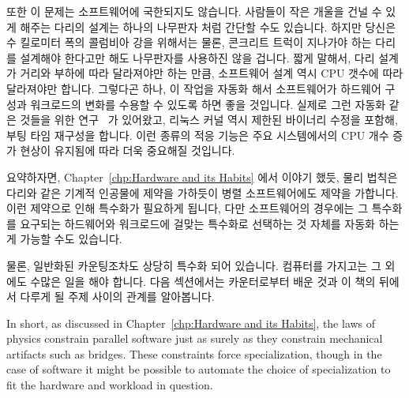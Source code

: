 \begin{lineref}
또한 이 문제는 소프트웨어에 국한되지도 않습니다.
사람들이 작은 개울을 건널 수 있게 해주는 다리의 설계는 하나의 나무판자 처럼
간단할 수도 있습니다.
하지만 당신은 수 킬로미터 폭의 콜럼비아 강을 위해서는 물론, 콘크리트 트럭이
지나가야 하는 다리를 설계해야 한다고만 해도 나무판자를 사용하진 않을 겁니다.
짧게 말해서, 다리 설계가 거리와 부하에 따라 달라져야만 하는 만큼, 소프트웨어
설계 역시 CPU 갯수에 따라 달라져야만 합니다.
그렇다곤 하나, 이 작업을 자동화 해서 소프트웨어가 하드웨어 구성과 워크로드의
변화를 수용할 수 있도록 하면 좋을 것입니다.
실제로 그런 자동화 같은 것들을 위한 연구~\cite{Appavoo03a,Soules03a} 가
있어왔고, 리눅스 커널 역시 제한된 바이너리 수정을 포함해, 부팅 타임 재구성을
합니다.
이런 종류의 적응 기능은 주요 시스템에서의 CPU 개수 증가 현상이 유지됨에 따라
더욱 중요해질 것입니다.

요약하자면, Chapter~\ref{chp:Hardware and its Habits} 에서 이야기 했듯, 물리
법칙은 다리와 같은 기계적 인공물에 제약을 가하듯이 병렬 소프트웨어에도 제약을
가합니다.
이런 제약으로 인해 특수화가 필요하게 됩니다, 다만 소프트웨어의 경우에는 그
특수화를 요구되는 하드웨어와 워크로드에 걸맞는 특수화로 선택하는 것 자체를
자동화 하는게 가능할 수도 있습니다.

물론, 일반화된 카운팅조차도 상당히 특수화 되어 있습니다.
컴퓨터를 가지고는 그 외에도 수많은 일을 해야 합니다.
다음 섹션에서는 카운터로부터 배운 것과 이 책의 뒤에서 다루게 될 주제 사이의
관계를 알아봅니다.
\iffalse

In short, as discussed in
Chapter~\ref{chp:Hardware and its Habits},
the laws of physics constrain parallel software just as surely as they
constrain mechanical artifacts such as bridges.
These constraints force specialization, though in the case of software
it might be possible to automate the choice of specialization to
fit the hardware and workload in question.


\end{lineref}
